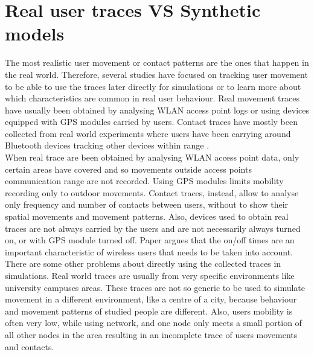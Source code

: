 \section{Real user traces VS Synthetic models}
The most realistic user movement or contact patterns are the ones that happen in the real world. Therefore, several studies have focused on tracking user movement to be able to use the traces later directly for simulations or to learn more about which characteristics are common in real user behaviour. Real movement traces have usually been obtained by analysing WLAN access point logs \cite{Balachandran:2002:CUB:511399.511359} \cite{Ghosh:2006:PMP:1132983.1132993} \cite{Shaffer:2005:AMM:1104998.1105285} or using devices equipped with GPS modules carried by users\cite{Ashbrook:2002:LSL:862896.881068}. Contact traces have mostly been collected from real world experiments where users have been carrying around Bluetooth devices tracking other devices within range \cite{Natarajan:2007:UUI:1762888.1762904}.
\\

When real trace are been obtained by analysing WLAN access point data, only certain areas have covered and so movements outside access points communication range are not recorded. Using GPS modules limits mobility recording only to outdoor movements. Contact traces, instead, allow to analyse only frequency and number of contacts between users, without to show their spatial movements and movement patterns. Also, devices used to obtain real traces are not always carried by the users and are not necessarily always turned on, or with GPS module turned off. Paper \cite{ImpactofHumanMobility} argues that the on/off times are an important characteristic of wireless users that needs to be taken into account.
\\

There are some other problems about directly using the collected traces in simulations. Real world traces are usually from very specific environments like university campuses areas. These traces are not so generic to be used to simulate movement in a different environment, like a centre of a city, because behaviour and movement patterns of studied people are different. Also, users mobility is often very low, while using network, and one node only meets a small portion of all other nodes in the area resulting in an incomplete trace of users movements and contacts.
\\


